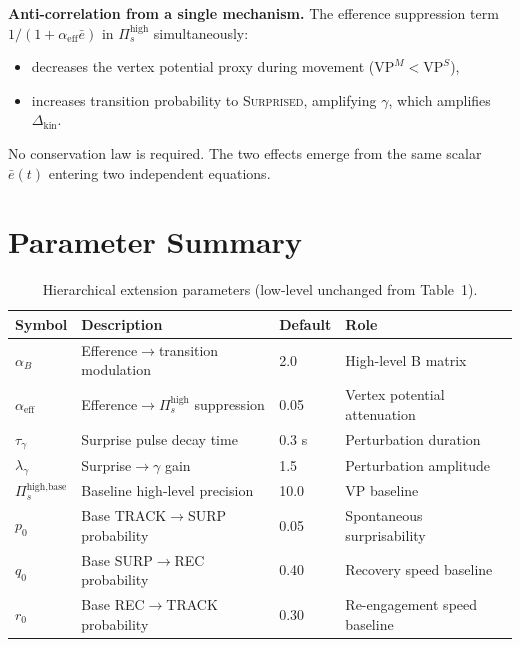 \documentclass[11pt, a4paper]{article}
\newcommand{\Pish}{\Pi_s^{\text{high}}}
\begin{document}
\begin{resultbox}
\textbf{Anti-correlation from a single mechanism.}
The efference suppression term $1/(1+\alpha_{\text{eff}}\bar{e})$ in
$\Pish$ simultaneously:
\begin{itemize}[noitemsep]
  \item decreases the vertex potential proxy during movement ($\text{VP}^M < \text{VP}^S$),
  \item increases transition probability to \textsc{Surprised}, amplifying $\gamma$,
        which amplifies $\Delta_{\text{kin}}$.
\end{itemize}
No conservation law is required. The two effects emerge from the same
scalar $\bar{e}(t)$ entering two independent equations.
\end{resultbox}

\section{Parameter Summary}

\begin{table}[ht]
\centering
\caption{Hierarchical extension parameters (low-level unchanged from Table~1).}
\renewcommand{\arraystretch}{1.35}
\begin{tabular}{llll}
\toprule
\textbf{Symbol} & \textbf{Description} & \textbf{Default} & \textbf{Role} \\
\midrule
$\alpha_B$        & Efference$\to$transition modulation    & 2.0  & High-level B matrix \\
$\alpha_{\text{eff}}$ & Efference$\to\Pish$ suppression    & 0.05 & Vertex potential attenuation \\
$\tau_\gamma$     & Surprise pulse decay time              & 0.3 s & Perturbation duration \\
$\lambda_\gamma$  & Surprise$\to\gamma$ gain               & 1.5  & Perturbation amplitude \\
$\Pi_s^{\text{high,base}}$ & Baseline high-level precision & 10.0 & VP baseline \\
\midrule
$p_0$             & Base TRACK$\to$SURP probability        & 0.05 & Spontaneous surprisability \\
$q_0$             & Base SURP$\to$REC probability          & 0.40 & Recovery speed baseline \\
$r_0$             & Base REC$\to$TRACK probability         & 0.30 & Re-engagement speed baseline \\
\bottomrule
\end{tabular}
\end{table}
\end{document}
